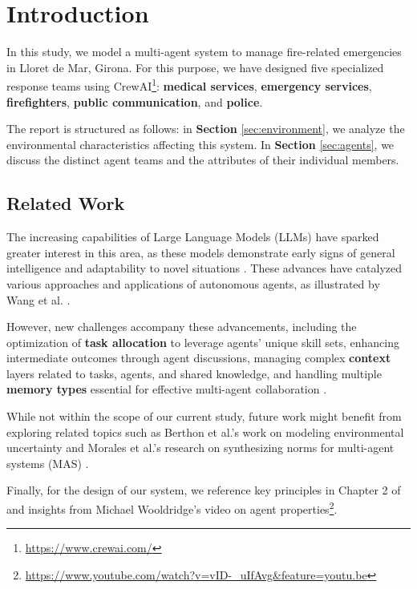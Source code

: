 \section{Introduction}
\label{sec:introduction}

In this study, we model a multi-agent system to manage fire-related emergencies in Lloret de Mar, Girona. For this purpose, we have designed five specialized response teams using CrewAI\footnote{\url{https://www.crewai.com/}}: \textbf{medical services}, \textbf{emergency services}, \textbf{firefighters}, \textbf{public communication}, and \textbf{police}.

The report is structured as follows: in \textbf{Section} \ref{sec:environment}, we analyze the environmental characteristics affecting this system. In \textbf{Section} \ref{sec:agents}, we discuss the distinct agent teams and the attributes of their individual members.

\subsection{Related Work}

The increasing capabilities of Large Language Models (LLMs) have sparked greater interest in this area, as these models demonstrate early signs of general intelligence \cite{bubeck2023sparksartificialgeneralintelligence} and adaptability to novel situations \cite{HAUPTMAN2023107451}. These advances have catalyzed various approaches and applications of autonomous agents, as illustrated by Wang et al. \cite{Wang_2024}.

However, new challenges accompany these advancements, including the optimization of \textbf{task allocation} to leverage agents' unique skill sets, enhancing intermediate outcomes through agent discussions, managing complex \textbf{context} layers related to tasks, agents, and shared knowledge, and handling multiple \textbf{memory types} essential for effective multi-agent collaboration \cite{han2024llmmultiagentsystemschallenges}.

While not within the scope of our current study, future work might benefit from exploring related topics such as Berthon et al.'s work on modeling environmental uncertainty \cite{berthon2024naturalstrategicabilitystochastic} and Morales et al.'s research on synthesizing norms for multi-agent systems (MAS) \cite{morales2017synthesisingevolutionarilystablenormative}.

Finally, for the design of our system, we reference key principles in Chapter 2 of \cite{wooldridge2009introduction} and insights from Michael Wooldridge's video on agent properties\footnote{\url{https://www.youtube.com/watch?v=vID-_uIfAvg&feature=youtu.be}}.

